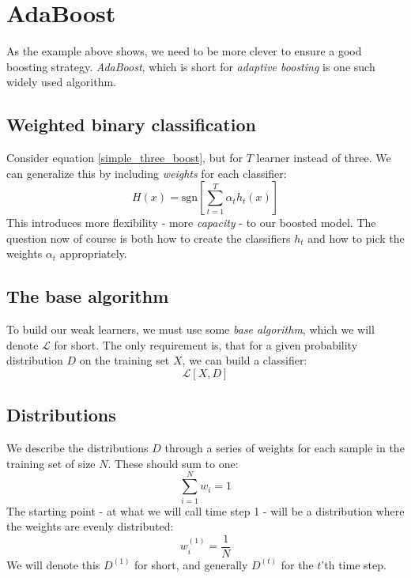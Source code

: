 \documentclass[12pt, a4paper]{article}
\numberwithin{equation}{section}
\begin{document}
\section{AdaBoost}
As the example above shows, we need to be more clever to ensure a good boosting strategy. \textit{AdaBoost}, which is short for \textit{adaptive boosting} is one such widely used algorithm.

\subsection{Weighted binary classification}
Consider equation \ref{simple_three_boost}, but for $T$ learner instead of three. We can generalize this by including \textit{weights} for each classifier:
\begin{equation}
H(x)=\textrm{sgn}\left[\sum_{t=1}^T \alpha_t h_t(x)\right]
\label{boosted_classifier}
\end{equation}
This introduces more flexibility - more \textit{capacity} - to our boosted model. The question now of course is both how to create the classifiers $h_t$ and how to pick the weights $\alpha_t$ appropriately.

\subsection{The base algorithm}
To build our weak learners, we must use some \textit{base algorithm}, which we will denote $\mathcal{L}$ for short. The only requirement is, that for a given probability distribution $D$ on the training set $X$, we can build a classifier:
\begin{equation}
\mathcal{L}[X,D]
\end{equation}

\subsection{Distributions}
We describe the distributions $D$ through a series of weights for each sample in the training set of size $N$. These should sum to one:
\begin{equation}
\sum_{i=1}^N w_i=1
\end{equation}
The starting point - at what we will call time step 1 - will be a distribution where the weights are evenly distributed:
\begin{equation}
w_i^{(1)}=\frac{1}{N}
\label{time_step_1}
\end{equation}
We will denote this $D^{(1)}$ for short, and generally $D^{(t)}$ for the $t$'th time step.
\end{document}
